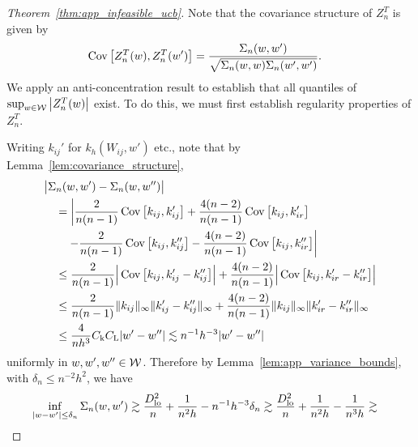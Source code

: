 \begin{proof}[Theorem~\ref{thm:app_infeasible_ucb}]

  Note that the covariance structure of $Z_n^T$ is given by
  \begin{align*}
    \operatorname{Cov}\big[
      Z_n^T(w),
      Z_n^T(w')
    \big]
    &=
    \frac{\Sigma_n(w,w')}
    {\sqrt{\Sigma_n(w,w) \Sigma_n(w',w')}}.
  \end{align*}
  We apply an anti-concentration result
  to establish that all quantiles of
  $\sup_{w \in \mathcal{W}} \big|Z_n^T(w)\big|$ exist.
  To do this, we must first establish regularity
  properties of $Z_n^T$.


  Writing $k_{i j}'$
  for $k_h(W_{i j},w')$ etc.,
  note that by Lemma~\ref{lem:covariance_structure},
  \begin{align*}
    &\big|
    \Sigma_n(w,w')
    -
    \Sigma_n(w, w'')
    \big| \\
    &\quad=
    \left|
    \frac{2}{n(n-1)}
    \operatorname{Cov}\big[
      k_{i j},
      k_{i j}'
    \big]
    +
    \frac{4(n-2)}{n(n-1)}
    \operatorname{Cov}\big[
      k_{i j},
      k_{i r}'
    \big]
    \right. \\
    &\left.
    \qquad-
    \frac{2}{n(n-1)}
    \operatorname{Cov}\big[
      k_{i j},
      k_{i j}''
    \big]
    -
    \frac{4(n-2)}{n(n-1)}
    \operatorname{Cov}\big[
      k_{i j},
      k_{i r}''
    \big]
    \right| \\
    &\quad\leq
    \frac{2}{n(n-1)}
    \Big|
    \operatorname{Cov}\big[
      k_{i j},
      k_{i j}' - k_{i j}''
    \big]
    \Big|
    +
    \frac{4(n-2)}{n(n-1)}
    \Big|
    \operatorname{Cov}\big[
      k_{i j},
      k_{i r}' - k_{i r}''
    \big]
    \Big| \\
    &\quad\leq
    \frac{2}{n(n-1)}
    \|k_{i j}\|_\infty
    \|k_{i j}' - k_{i j}''\|_\infty
    +
    \frac{4(n-2)}{n(n-1)}
    \|k_{i j}\|_\infty
    \|k_{i r}' - k_{i r}''\|_\infty \\
    &\quad\leq
    \frac{4}{n h^3}
    C_\mathrm{k} C_\mathrm{L}
    |w'-w''|
    \lesssim
    n^{-1}h^{-3} |w'-w''|
  \end{align*}
  uniformly in $w, w', w'' \in \mathcal{W}$.
  Therefore by Lemma~\ref{lem:app_variance_bounds},
  with $\delta_n \leq n^{-2} h^2$,
  we have
  \begin{align*}
    \inf_{|w-w'| \leq \delta_n}
    \Sigma_n(w,w')
    &\gtrsim
    \frac{\Dl^2}{n}
    + \frac{1}{n^2h}
    - n^{-1} h^{-3} \delta_n
    \gtrsim
    \frac{\Dl^2}{n}
    + \frac{1}{n^2h}
    - \frac{1}{n^3h}
    \gtrsim

\end{align*}
\end{proof}
